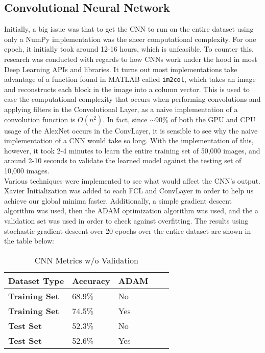 \subsection{Convolutional Neural Network}
\label{sec:evaluation:Convolutional Neural Network}

Initially, a big issue was that to get the CNN to run on the entire dataset using only a NumPy implementation was the sheer computational complexity. For one epoch, it initially took around 12-16 hours, which is unfeasible. To counter this, research was conducted with regards to how CNNs work under the hood in most Deep Learning APIs and libraries. It turns out most implementations take advantage of a function found in MATLAB called \verb|im2col|, which takes an image and reconstructs each block in the image into a column vector. This is used to ease the computational complexity that occurs when performing convolutions and applying filters in the Convolutional Layer, as a naive implementation of a convolution function is $O(n^2)$. In fact, since $\sim$90\% of both the GPU and CPU usage of the AlexNet occurs in the ConvLayer, it is sensible to see why the naive implementation of a CNN would take so long. With the implementation of this, however, it took 2-4 minutes to learn the entire training set of 50,000 images, and around 2-10 seconds to validate the learned model against the testing set of 10,000 images. \\

\noindent Various techniques were implemented to see what would affect the CNN's output. Xavier Initialization was added to each FCL and ConvLayer in order to help us achieve our global minima faster. Additionally, a simple gradient descent algorithm was used, then the ADAM optimization algorithm was used, and the a validation set was used in order to check against overfitting. The results using stochastic gradient descent over 20 epochs over the entire dataset are shown in the table below:

\begin{table}[ht] 
    \centering
    \begin{tabular}{|l|l|l|l|l|}
        \hline
        \textbf{Dataset Type} & \textbf{Accuracy} & \textbf{ADAM}\\
        \hline
        \textbf{Training Set} & 68.9\% & No\\
        \textbf{Training Set} & 74.5\% & Yes\\
        \textbf{Test Set} & 52.3\% & No\\
        \textbf{Test Set} & 52.6\% & Yes\\
        \hline
    \end{tabular}
    \caption{CNN Metrics w/o Validation}
    \label{tab:Table3}
\end{table}

